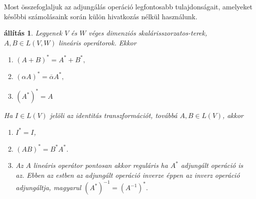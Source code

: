 \documentclass[a4paper, showtrims]{memoir}
\theoremstyle{plain}
\newtheorem{proposition}{állítás}[chapter]
\theoremstyle{remark}
\theoremstyle{definition}
\begin{document}
Most összefoglaljuk az adjungálás operáció legfontosabb tulajdonságait,
amelyeket későbbi számolásaink során külön hivatkozás nélkül használunk.
\begin{proposition}
	Legyenek $V$ és $W$ véges dimenziós skalárisszorzatos-terek, $A,B\in L\left( V,W \right)$ lineáris operátorok.
	Ekkor
	\begin{enumerate}
		\item[1.] $\left( A+B \right)^\ast=A^\ast+B^\ast,$
		\item[2.] $\left( \alpha A \right)^\ast=\overline\alpha A^\ast,$
		\item[3.] $(A^\ast)^\ast=A$
	\end{enumerate}
	Ha $I\in L\left( V \right)$ jelöli az identitás transzformációt, továbbá $A,B\in L\left( V \right)$, akkor
	\begin{enumerate}
		\item[4.] $I^\ast=I$,
		\item[5.] $\left( AB \right)^\ast=B^\ast A^\ast$.
		\item[6.] Az $A$ lineáris operátor pontosan akkor reguláris ha $A^\ast$ adjungált operáció is az.
		      Ebben az estben az adjungált operáció inverze éppen az inverz operáció adjungáltja, magyarul
		      \begin{math}
			      \left( A^\ast \right)^{-1}=\left( A^{-1} \right)^\ast.
		      \end{math}
		      \qedhere
	\end{enumerate}
\end{proposition}
\end{document}

